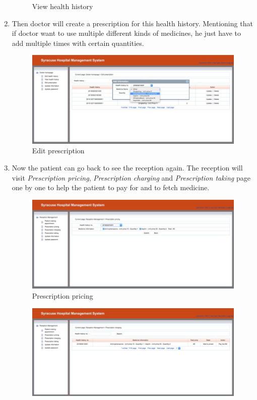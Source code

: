 \begin{enumerate}
\begin{figure}[H]
    \caption{View health history}
    \label{fig:pp4}
\end{figure}
    \item Then doctor will create a prescription for this health history. Mentioning that if doctor want to use multiple different kinds of medicines, he just have to add multiple times with certain quantities.
    \begin{figure}[H]
    \centering
    \includegraphics[width=\textwidth]{pp/pp5.jpg}
    \caption{Edit prescription}
    \label{fig:pp5}
\end{figure}
    \item Now the patient can go back to see the reception again. The reception will visit \emph{Prescription pricing}, \emph{Prescription charging} and \emph{Prescription taking} page one by one to help the patient to pay for and to fetch medicine. 
    \begin{figure}[H]
    \centering
    \includegraphics[width=\textwidth]{pp/pp6.jpg}
    \caption{Prescription pricing}
    \label{fig:pp6}
\end{figure}
    \begin{figure}[H]
    \centering
    \includegraphics[width=\textwidth]{pp/pp7.jpg}

\end{figure}
\end{enumerate}
